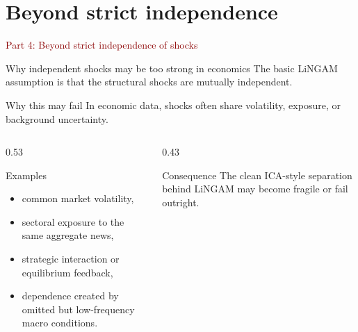 \documentclass[dvipsnames,aspectratio=169,handout]{beamer}
\begin{document}

\section{Beyond strict independence}

\begin{frame}{}
\begin{center}
{\Huge \textcolor{DarkRed}{Part 4: Beyond strict independence of shocks}}
\end{center}
\end{frame}

\begin{frame}{Why independent shocks may be too strong in economics}
The basic LiNGAM assumption is that the structural shocks are mutually independent.

\begin{alertblock}{Why this may fail}
In economic data, shocks often share volatility, exposure, or background uncertainty.
\end{alertblock}

\begin{columns}[T]
\begin{column}{0.53\textwidth}
\begin{block}{Examples}
\begin{itemize}
    \item common market volatility,
    \item sectoral exposure to the same aggregate news,
    \item strategic interaction or equilibrium feedback,
    \item dependence created by omitted but low-frequency macro conditions.
\end{itemize}
\end{block}
\end{column}
\begin{column}{0.43\textwidth}
\begin{block}{Consequence}
The clean ICA-style separation behind LiNGAM may become fragile or fail outright.
\end{block}
\end{column}
\end{columns}
\end{frame}
\end{document}
